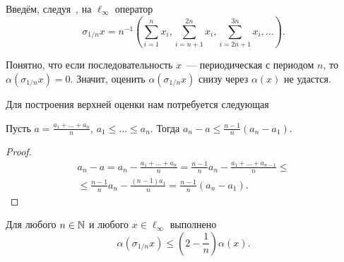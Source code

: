 Введём, следуя~\cite[p. 131, prop. 2.b.2]{lindenstrauss1979classical},
на $\ell_\infty$ оператор
\begin{equation}
	\sigma_{1/n} x = n^{-1}
	\left(
		\sum_{i=1}^{n} x_i,
		\sum_{i=n+1}^{2n} x_i,
		\sum_{i=2n+1}^{3n} x_i,
		...
	\right).
\end{equation}

Понятно, что если последовательность $x$~--- периодическая с периодом $n$,
то $\alpha(\sigma_{1/n}x)=0$.
Значит, оценить $\alpha(\sigma_{1/n}x)$ снизу через $\alpha(x)$ не удастся.

Для построения верхней оценки нам потребуется следующая

\begin{lemma}
	\label{thm:distance_from_average}
	Пусть $a=\frac{a_1+...+a_n}{n}$, $a_1 \leq ... \leq a_n$.
	Тогда $a_n - a \leq \frac{n-1}{n} (a_n - a_1)$.
\end{lemma}

\begin{proof}
	\begin{multline}
		a_n - a = a_n - \frac{a_1+...+a_n}{n}
		=
		\frac{n-1}{n}a_n - \frac{a_1+...+a_{n-1}}{n}
		\leq
		\\\leq
		\frac{n-1}{n}a_n - \frac{(n-1)a_1}{n}
		=
		\frac{n-1}{n}(a_n - a_1)
		.
	\end{multline}
\end{proof}

\begin{theorem}
	\label{thm:alpha_sigma_1_n}
	Для любого $n\in\mathbb{N}$ и любого $x\in\ell_\infty$ выполнено
	\begin{equation}
		\alpha(\sigma_{1/n} x) \leq \left( 2- \frac{1}{n} \right) \alpha(x)
		.
	\end{equation}
\end{theorem}

